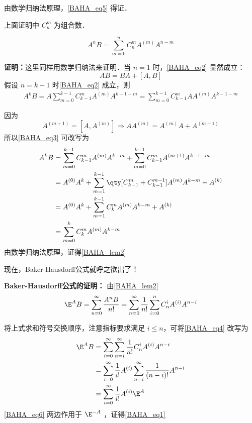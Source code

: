 由数学归纳法原理，\autoref{BAHA_eq5} 得证．

上面证明中 $C_n^m$ 为组合数．
\begin{lemma}{}\label{BAHA_lem2}
\begin{equation}\label{BAHA_eq2}
A^nB=\sum_{m=0}^{n}C_{n}^mA^{(m)}A^{n-m}
\end{equation}
\end{lemma}
\textbf{证明：}这里同样用数学归纳法来证明．当 $n=1$ 时，\autoref{BAHA_eq2} 显然成立：
\begin{equation}
AB=BA+[A,B]
\end{equation}
假设 $n=k-1$ 时\autoref{BAHA_eq2} 成立，则
\begin{equation}\label{BAHA_eq3}
\begin{aligned}
A^{k}B=A\sum_{m=0}^{k-1}C_{k-1}^mA^{(m)}A^{k-1-m}=\sum_{m=0}^{k-1}C_{k-1}^mAA^{(m)}A^{k-1-m}
\end{aligned}
\end{equation}

因为
\begin{equation}
A^{(m+1)}=[A,A^{(m)}]\Rightarrow AA^{(m)}=A^{(m)}A+A^{(m+1)}
\end{equation}
所以\autoref{BAHA_eq3} 可改写为
\begin{equation}
\begin{aligned}
A^k B&=\sum_{m=0}^{k-1}C_{k-1}^mA^{(m)}A^{k-m}+\sum_{m=0}^{k-1}C_{k-1}^mA^{(m+1)}A^{k-1-m}\\
&=A^{(0)}A^{k}+\sum_{m=1}^{k-1}\qty[C_{k-1}^m+C_{k-1}^{m-1}]A^{(m)}A^{k-m}+A^{(k)}\\
&=A^{(0)}A^{k}+\sum_{m=1}^{k-1}C_{k}^mA^{(m)}A^{k-m}+A^{(k)}\\
&=\sum_{m=0}^{k}C_{k}^mA^{(m)}A^{k-m}
\end{aligned}
\end{equation}
由数学归纳法原理，证得\autoref{BAHA_lem2} 

现在，Baker-Hausdorff公式就呼之欲出了！

\textbf{Baker-Hausdorff公式的证明：}
由\autoref{BAHA_lem2} 
\begin{equation}\label{BAHA_eq4}
\E^A B=\sum_{n=0}^{\infty}\frac{A^nB}{n!}=\sum_{n=0}^{\infty}\frac{1}{n!}\sum_{i=0}^{n}C_{n}^iA^{(i)}A^{n-i}
\end{equation}

将上式求和符号交换顺序，注意指标要求满足 $i\leq n$，可将\autoref{BAHA_eq4} 改写为
\begin{equation}\label{BAHA_eq6}
\begin{aligned}
\E^A B&=\sum_{i=0}^{\infty}\sum_{n=i}^{\infty}\frac{1}{n!}C_{n}^iA^{(i)}A^{n-i}\\
&=\sum_{i=0}^{\infty}\frac{1}{i!}A^{(i)}\sum_{n=i}^{\infty}\frac{1}{(n-i)!}A^{n-i}\\
&=\sum_{i=0}^{\infty}\frac{1}{i!}A^{(i)}\E^A
\end{aligned}
\end{equation}
\autoref{BAHA_eq6} 两边作用于 $\E^{-A}$ ，证得\autoref{BAHA_eq1} 

